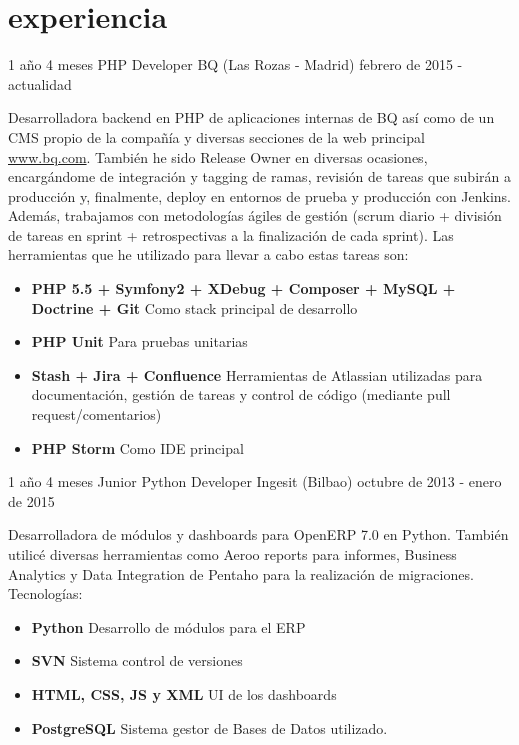 \documentclass[]{friggeri-cv} %
\begin{document}

\section{experiencia}
\begin{entrylist}
\entry
{1 año 4 meses}
{PHP Developer {\normalfont BQ (Las Rozas - Madrid)}}
{febrero de 2015 - actualidad}
{Desarrolladora backend en PHP de aplicaciones internas de BQ as\'i como de un CMS propio de la compa\~n\'ia y diversas secciones de la web principal \href{http://bq.com}{www.bq.com}. Tambi\'en he sido Release Owner en diversas ocasiones, encarg\'andome de integraci\'on y tagging de ramas, revisi\'on de tareas que subir\'an a producci\'on y, finalmente, deploy en entornos de prueba y producci\'on con Jenkins. 
Adem\'as, trabajamos con metodolog\'ias \'agiles de gesti\'on (scrum diario + divisi\'on de tareas en sprint + retrospectivas a la finalizaci\'on de cada sprint).
 Las herramientas que he utilizado para llevar a cabo estas tareas son:
\begin{itemize}
\item\textbf{PHP 5.5 + Symfony2 + XDebug + Composer + MySQL + Doctrine + Git} Como stack principal de desarrollo
\item\textbf{PHP Unit} Para pruebas unitarias
\item\textbf{Stash + Jira + Confluence} Herramientas de Atlassian utilizadas para documentación, gesti\'on de tareas y control de c\'odigo (mediante pull request/comentarios)
\item\textbf{PHP Storm} Como IDE principal\\
\end{itemize}}
\end{entrylist}

\begin{entrylist}
\entry
{1 año 4 meses}
{Junior Python Developer {\normalfont Ingesit (Bilbao)}}
{octubre de 2013 - enero de 2015}
{Desarrolladora de m\'odulos y dashboards para OpenERP 7.0 en Python. Tambi\'en utilic\'e diversas herramientas como Aeroo reports para informes, Business Analytics y Data Integration de Pentaho para la realizaci\'on de migraciones. Tecnolog\'ias:
\begin{itemize}
\item\textbf{Python} Desarrollo de módulos para el ERP
\item\textbf{SVN} Sistema control de versiones
\item\textbf{HTML, CSS, JS y XML} UI de los dashboards
\item\textbf{PostgreSQL} Sistema gestor de Bases de Datos utilizado.\\
\end{itemize}}
\end{entrylist}
\end{document}
